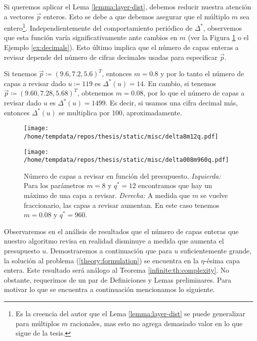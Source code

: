 Si queremos aplicar el Lema \ref{lemma:layer-dist}, debemos reducir nuestra atención a vectores
$\vec{p}$ enteros. Esto se debe a que debemos asegurar que el múltiplo $m$ sea entero\footnote{
	Es la creencia del autor que el Lema \ref{lemma:layer-dist} se puede generalizar para múltiplos
	$m$ racionales, mas esto no agrega demasiado valor en lo que sigue de la tesis.
}. Independientemente del comportamiento
periódico de $\Delta^*$, observemos que esta función varía significativamente ante cambios en $m$
(ver la Figura \ref{fig:m:ex} o el Ejemplo \ref{ex:decimals}). Esto último implica que el número de
capas enteras a revisar depende del número de cifras decimales usadas para especificar $\vec{p}$.

\begin{example}
	\label{ex:decimals}
	Si tenemos $\vec{p} \coloneq (9.6, 7.2, 5.6)^T$, entonces $m = 0.8$ y por lo tanto el número de
	capas a revisar dado $u \coloneq 119$ es $\Delta^*(u) = 14$. En cambio, si tenemos $\vec{p} \coloneq
	(9.60, 7.28, 5.68)^T$, obtenemos $m = 0.08$, por lo que el número de capas a revisar dado $u$ es
	$\Delta^*(u) = 1499$. Es decir, si usamos una cifra decimal más, entonces $\Delta^*(u)$ se
	multiplica por 100, aproximadamente.
\end{example}

\begin{figure}[htbp]
  \centering

  \begin{minipage}[t]{0.48\textwidth}
    \centering
    \texttt{[image: /home/tempdata/repos/thesis/static/misc/delta8m12q.pdf]}
  \end{minipage}
  \hfill
  \begin{minipage}[t]{0.48\textwidth}
    \centering
    \texttt{[image: /home/tempdata/repos/thesis/static/misc/delta008m960q.pdf]}
  \end{minipage}

  \caption{Número de capas a revisar en función del presupuesto. \textit{Izquierda: }Para los
	  parámetros $m = 8$ y $q^* = 12$ encontramos que hay un máximo de una capa a revisar.
	\textit{Derecha: } A medida que $m$ se vuelve fraccionario, las capas a revisar aumentan. En
		este caso tenemos $m = 0.08$ y $q^* = 960$.}
  \label{fig:m:ex}
\end{figure}

Observaremos en el análisis de resultados que el número de capas enteras que nuestro algoritmo
revisa en realidad disminuye a medida que aumenta el presupuesto $u$. Demostraremos a continuación
que para $u$ suficientemente grande, la solución al problema (\ref{theory:formulation}) se encuentra
en la $\eta$-ésima capa entera. Este resultado será análogo al Teorema \ref{infinite:th:complexity}.
No obstante, requerimos de un par de Definiciones y Lemas preliminares. Para motivar lo que
se encuentra a continuación mencionamos lo siguiente.

